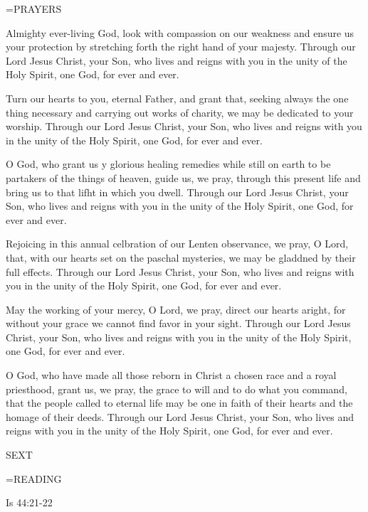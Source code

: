 \hangindent=\parindent \small PRAYERS
\begin{description}[labelindent=\parindent, leftmargin=*]
\item [Saturday after Ash Wednesday:] 	Almighty ever-living God, look with compassion on our weakness and ensure us your protection by stretching forth the right hand of your majesty. Through our Lord Jesus Christ, your Son, who lives and reigns with you in the unity of the Holy Spirit, one God, for ever and ever.
\item [Week 1:] 	Turn our hearts to you, eternal Father, and grant that, seeking always the one thing necessary and carrying out works of charity, we may be dedicated to your worship. Through our Lord Jesus Christ, your Son, who lives and reigns with you in the unity of the Holy Spirit, one God, for ever and ever.
\item [Week 2:] 	O God, who grant us y glorious healing remedies while still on earth to be partakers of the things of heaven, guide us, we pray, through this present life and bring us to that lifht in which you dwell. Through our Lord Jesus Christ, your Son, who lives and reigns with you in the unity of the Holy Spirit, one God, for ever and ever.
\item [Week 3:] 	Rejoicing in this annual celbration of our Lenten observance, we pray, O Lord, that, with our hearts set on the paschal mysteries, we may be gladdned by their full effects. Through our Lord Jesus Christ, your Son, who lives and reigns with you in the unity of the Holy Spirit, one God, for ever and ever.
\item [Week 4:] 	May the working of your mercy, O Lord, we pray, direct our hearts aright, for without your grace we cannot find favor in your sight. Through our Lord Jesus Christ, your Son, who lives and reigns with you in the unity of the Holy Spirit, one God, for ever and ever.
\item [Week 5:] 	O God, who have made all those reborn in Christ a chosen race and a royal priesthood, grant us, we pray, the grace to will and to do what you command, that the people called to eternal life may be one in faith of their hearts and the homage of their deeds. Through our Lord Jesus Christ, your Son, who lives and reigns with you in the unity of the Holy Spirit, one God, for ever and ever.
\end{description}

\begin{flushleft}\normalsize SEXT\\\end{flushleft}
\hangindent=\parindent \small READING
\begin{description}[labelindent=\parindent, leftmargin=*]
\item [Saturday after Ash Wednesday \& Weeks 1-4:]     Is 44:21-22 \textbf{    \\}
\end{description}

